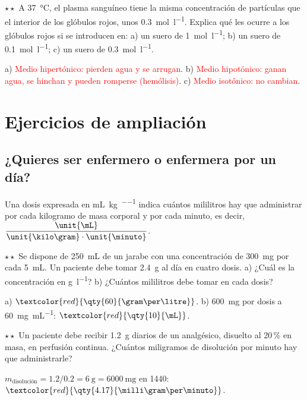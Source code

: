 \begin{exercise}
    \(\star\star\) A \qty{37}{\degreeCelsius}, el plasma sanguíneo tiene la misma concentración de partículas que el interior de los
    glóbulos rojos, unos \qty{0.3}{\mol\per\litre}. Explica qué les ocurre a los glóbulos rojos si se introducen en: a) un suero de
    \qty{1}{\mol\per\litre}; b) un suero de \qty{0.1}{\mol\per\litre}; c) un suero de \qty{0.3}{\mol\per\litre}.
    \begin{solu}
        a) \textcolor{red}{Medio hipertónico: pierden agua y se arrugan}. b) \textcolor{red}{Medio hipotónico: ganan agua, se hinchan
        y pueden romperse (hemólisis)}. c) \textcolor{red}{Medio isotónico: no cambian}.
    \end{solu}
\end{exercise}

\section{Ejercicios de ampliación}\label{sec:ud2-ampliacion}

\subsection{¿Quieres ser enfermero o enfermera por un día?}

Una dosis expresada en \unit{\mL\per\kilo\gram\per\minuto} indica cuántos mililitros hay que administrar por cada kilogramo
de masa corporal y por cada minuto, es decir, \(\dfrac{\unit{\mL}}{\unit{\kilo\gram} \cdot \unit{\minuto}}\).

\begin{exercise}
    \(\star\star\) Se dispone de \qty{250}{\mL} de un jarabe con una concentración de \qty{300}{\milli\gram} por cada
    \qty{5}{\mL}. Un paciente debe tomar \qty{2.4}{\gram} al día en cuatro dosis. a) ¿Cuál es la concentración en
    \unit{\gram\per\litre}? b) ¿Cuántos mililitros debe tomar en cada dosis?
    \begin{solu}
        a) \(\textcolor{red}{\qty{60}{\gram\per\litre}}\). b) \qty{600}{\milli\gram} por dosis a \qty{60}{\milli\gram\per\mL}:
        \(\textcolor{red}{\qty{10}{\mL}}\).
    \end{solu}
\end{exercise}

\begin{exercise}
    \(\star\star\) Un paciente debe recibir \qty{1.2}{\gram} diarios de un analgésico, disuelto al 20\,\% en masa, en perfusión
    continua. ¿Cuántos miligramos de disolución por minuto hay que administrarle?
    \begin{solu}
        \(m_{\text{disolución}} = \num{1.2}/\num{0.2} = \qty{6}{\gram} = \qty{6000}{\milli\gram}\) en \qty{1440}{\minuto}:
        \(\textcolor{red}{\qty{4.17}{\milli\gram\per\minuto}}\).
    \end{solu}
\end{exercise}

